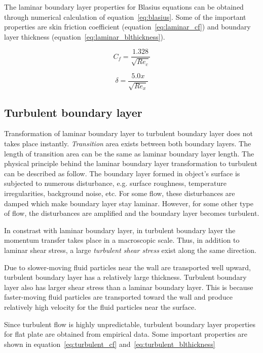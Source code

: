 The laminar boundary layer properties for Blasius equations can be obtained through numerical calculation of equation~\ref{eq:blasius}. Some of the important properties are skin friction coefficient (equation~\ref{eq:laminar_cf}) and boundary layer thickness (equation~\ref{eq:laminar_blthickness}).

\begin{equation} \label{eq:laminar_cf}
  C_f = \frac{1.328}{\sqrt{Re_c}}
\end{equation}

\begin{equation} \label{eq:laminar_blthickness}
  \delta = \frac{5.0x}{\sqrt{Re_x}}
\end{equation}

\subsection{Turbulent boundary layer}
Transformation of laminar boundary layer to turbulent boundary layer does not takes place instantly. \emph{Transition} area exists between both boundary layers. The length of transition area can be the same as laminar boundary layer length. The physical principle behind the laminar boundary layer transformation to turbulent can be described as follow. The boundary layer formed in object's surface is subjected to numerous disturbance, e.g. surface roughness, temperature irregularities, background noise, etc. For some flow, these disturbances are damped which make boundary layer stay laminar. However, for some other type of flow, the disturbances are amplified and the boundary layer becomes turbulent. 

In constrast with laminar boundary layer, in turbulent boundary layer the momentum transfer takes place in a macroscopic scale. Thus, in addition to laminar shear stress, a large \emph{turbulent shear stress} exist along the same direction.

Due to slower-moving fluid particles near the wall are transported well upward, turbulent boundary layer has a relatively large thickness. Turbulent boundary layer also has larger shear stress than a laminar boundary layer. This is because faster-moving fluid particles are transported toward the wall and produce relatively high velocity for the fluid particles near the surface.

Since turbulent flow is highly unpredictable, turbulent boundary layer properties for flat plate are obtained from empirical data. Some important properties are shown in equation~\ref{eq:turbulent_cf} and~\ref{eq:turbulent_blthickness}


